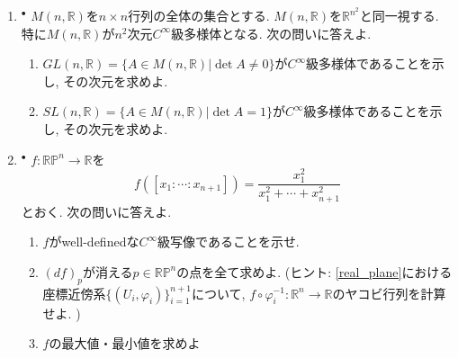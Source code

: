 \documentclass[dvipdfmx,a4paper,11pt]{article}
\newcommand{\R}{\mathbb{R}}
\theoremstyle{definition}
\begin{document}
\begin{enumerate}[label=\textbf{問}\ref*{sec-manifold}.\arabic*]


\item $^\bullet$ $M(n,\R)$を$n\times n$行列の全体の集合とする.  $M(n,\R)$を$\R^{n^2}$と同一視する. 特に$M(n,\R)$が$n^2$次元$C^{\infty}$級多様体となる. 次の問いに答えよ.
	\begin{enumerate}
	     \setlength{\parskip}{0cm}
  \setlength{\itemsep}{0pt} 
	\item $GL(n, \R) = \{ A \in M(n,\R) | \det A \neq 0\}$が$C^{\infty}$級多様体であることを示し, その次元を求めよ. 
	\item $SL(n, \R) = \{ A \in M(n,\R) | \det A =1\}$が$C^{\infty}$級多様体であることを示し, その次元を求めよ. 
	\end{enumerate}


\item $^\bullet$ $f : \R \mathbb{P}^{n} \rightarrow \R$を
$$
f([x_1: \cdots : x_{n+1}] ) = \frac{x_{1}^{2}}{x_{1}^{2} + \cdots+ x_{n+1}^{2}}
$$
とおく. 次の問いに答えよ.
\begin{enumerate}
     \setlength{\parskip}{0cm}
  \setlength{\itemsep}{0pt} 
\item $f$がwell-definedな$C^{\infty}$級写像であることを示せ.
\item $(df)_{p}$が消える$p \in \R \mathbb{P}^{n}$の点を全て求めよ. (ヒント: \ref{real_plane}における座標近傍系$\{ (U_i , \varphi_{i})\}_{i=1}^{n+1}$について, $f \circ \varphi_{i}^{-1} : \R^n \to \R$のヤコビ行列を計算せよ. )
\item $f$の最大値・最小値を求めよ
\end{enumerate}


\end{enumerate}
\end{document}
